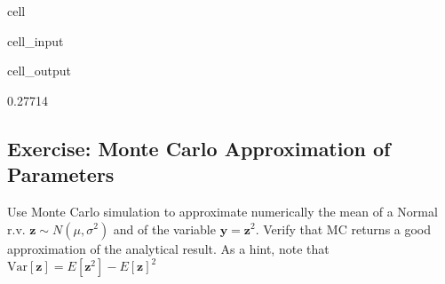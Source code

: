 \documentclass[letterpaper,10pt,english]{jupyterBook}
\begin{document}
\begin{sphinxuseclass}{cell}\begin{sphinxVerbatimInput}

\begin{sphinxuseclass}{cell_input}
\begin{sphinxVerbatim}[commandchars=\\\{\}]
  
  \PYG{p}{[}\PYG{p}{]}
    
    
    
\end{sphinxVerbatim}

\end{sphinxuseclass}\end{sphinxVerbatimInput}
\begin{sphinxVerbatimOutput}

\begin{sphinxuseclass}{cell_output}
\begin{sphinxVerbatim}[commandchars=\\\{\}]
0.27714
\end{sphinxVerbatim}

\end{sphinxuseclass}\end{sphinxVerbatimOutput}

\end{sphinxuseclass}

\subsection{Exercise: Monte Carlo Approximation of Parameters}
\label{\detokenize{01:exercise-monte-carlo-approximation-of-parameters}}
\sphinxAtStartPar
Use Monte Carlo simulation to approximate numerically the mean of a Normal r.v. \({\mathbf z} \sim N(\mu,\sigma^2)\) and of the variable \({\mathbf y}= {\mathbf z}^2\). Verify that MC returns a good approximation of the analytical result. As a hint, note that \(\mbox{Var}[{\mathbf z}]=E[{\mathbf z}^2]-E[{\mathbf z}]^2\)
\end{document}
